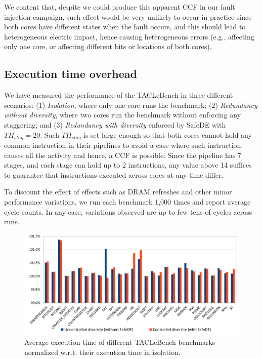 We content that, despite we could produce this apparent CCF in our fault injection campaign, such effect would be very unlikely to occur in practice since both cores have different states when the fault occurs, and this should lead to heterogeneous electric impact, hence causing heterogeneous errors (e.g., affecting only one core, or affecting different bits or locations of both cores).

\subsection{Execution time overhead}

We have measured the performance of the TACLeBench in three different scenarios: (1) \emph{Isolation}, where only one core runs the benchmark; (2) \emph{Redundancy without diversity}, where two cores run the benchmark without enforcing any staggering; and (3) \emph{Redundancy with diversity} enforced by SafeDE with $TH_{stag} = 20$.
Such $TH_{stag}$ is set large enough so that both cores cannot hold any common instruction in their pipelines to avoid a case where such instruction causes all the activity and hence, a CCF is possible. Since the pipeline has 7 stages, and each stage can hold up to 2 instructions, any value above 14 suffices to guarantee that instructions executed across cores at any time differ.

To discount the effect of effects such as DRAM refreshes and other minor performance variations, we run each benchmark 1,000 times and report average cycle counts. In any case, variations observed are up to few tens of cycles across runs.

\begin{figure}[t!]
\centering
  \includegraphics[width=1\columnwidth]{imgs/tacle_results.png} 
  \caption{Average execution time of different TACLeBench benchmarks normalized w.r.t. their execution time in isolation.}
  \label{fig:tacle_results}
\end{figure}


